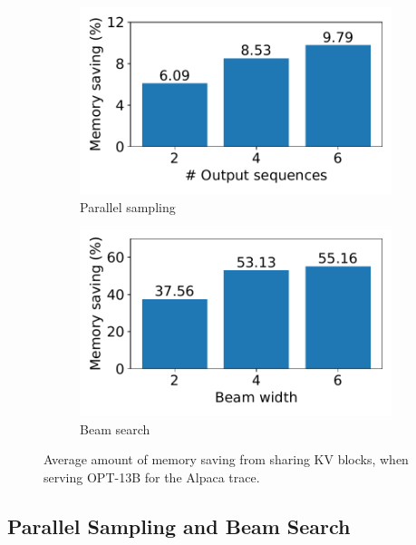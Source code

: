 \begin{figure}[t]
     \centering
     \begin{subfigure}[b]{0.5\linewidth}
         \centering
         \includegraphics[width=.9\columnwidth]{figures/experiments/mem_saving_parallel_gen.pdf}
         \vspace{-5pt}
         \caption{Parallel sampling}
     \end{subfigure}%
     \begin{subfigure}[b]{0.5\linewidth}
         \centering
         \includegraphics[width=.9\columnwidth]{figures/experiments/mem_saving_beam.pdf}
         \vspace{-5pt}
         \caption{Beam search}
     \end{subfigure}%
     \vspace{-7pt}
     \caption{Average amount of memory saving from sharing KV blocks, when serving OPT-13B for the Alpaca trace.}
    \vspace{-12pt}
\label{fig:memory-saving-sharing}
\end{figure}


\subsection{Parallel Sampling and Beam Search}
\label{sec:eval:beamsearch}

